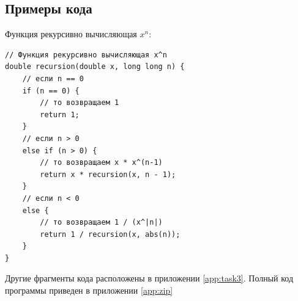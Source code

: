 \subsection{Примеры кода}

Функция рекурсивно вычисляющая $x^n$:

\begin{verbatim}
// Функция рекурсивно вычисляющая x^n
double recursion(double x, long long n) {
	// если n == 0
	if (n == 0) {
		// то возвращаем 1
		return 1;
	}
	// если n > 0
	else if (n > 0) {
		// то возвращаем x * x^(n-1)
		return x * recursion(x, n - 1);
	}
	// если n < 0
	else {
		// то возвращаем 1 / (x^|n|)
		return 1 / recursion(x, abs(n));
	}
}
\end{verbatim}

Другие фрагменты кода расположены в приложении \ref{app:task3}. Полный код программы приведен в приложении \ref{app:zip}

